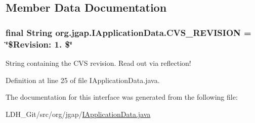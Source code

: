 \subsection{Member Data Documentation}
\hypertarget{interfaceorg_1_1jgap_1_1_i_application_data_a6ee319624a2b761f122fcc46d821694d}{
\subsubsection[{C\-V\-S\-\_\-\-R\-E\-V\-I\-S\-I\-O\-N}]{\setlength{\rightskip}{0pt plus 5cm}final String org.\-jgap.\-I\-Application\-Data.\-C\-V\-S\-\_\-\-R\-E\-V\-I\-S\-I\-O\-N = \char`\"{}\$Revision\-: 1. \$\char`\"{}\hspace{0.3cm}{\ttfamily [static]}}}\label{interfaceorg_1_1jgap_1_1_i_application_data_a6ee319624a2b761f122fcc46d821694d}
String containing the C\-V\-S revision. Read out via reflection! 

Definition at line 25 of file I\-Application\-Data.\-java.



The documentation for this interface was generated from the following file\-:\begin{DoxyCompactItemize}
\item 
L\-D\-H\-\_\-\-Git/src/org/jgap/\hyperlink{_i_application_data_8java}{I\-Application\-Data.\-java}\end{DoxyCompactItemize}

